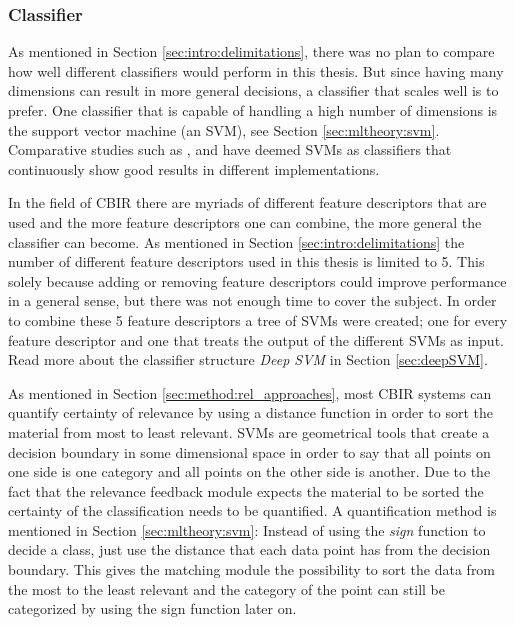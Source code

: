 \subsubsection{Classifier}
\label{sec:method:proposed:matching:classifier}
As mentioned in Section \ref{sec:intro:delimitations}, there was no plan to compare how well different classifiers would perform in this thesis. 
But since having many dimensions can result in more general decisions, a classifier that scales well is to prefer. One classifier that is capable of handling a high number of dimensions is the support vector machine (an SVM), see Section \ref{sec:mltheory:svm}. 
Comparative studies such as \cite{IRJET2017classificationMethods}, \cite{SMMR2016comparisionClassificationMethods} and \cite{Informatica2007revClassification} have deemed SVMs as classifiers that continuously show good results in different implementations. 

In the field of CBIR there are myriads of different feature descriptors that are used and the more feature descriptors one can combine, the more general the classifier can become. As mentioned in Section \ref{sec:intro:delimitations} the number of different feature descriptors used in this thesis is limited to 5. This solely because adding or removing feature descriptors could improve performance in a general sense, but there was not enough time to cover the subject. In order to combine these 5 feature descriptors a tree of SVMs were created; one for every feature descriptor and one that treats the output of the different SVMs as input. Read more about the classifier structure \emph{Deep SVM} in Section \ref{sec:deepSVM}. 

As mentioned in Section \ref{sec:method:rel_approaches}, most CBIR systems can quantify certainty of relevance by using a distance function in order to sort the material from most to least relevant. SVMs are geometrical tools that create a decision boundary in some dimensional space in order to say that all points on one side is one category and all points on the other side is another. Due to the fact that the relevance feedback module expects the material to be sorted the certainty of the classification needs to be quantified. A quantification method is mentioned in Section \ref{sec:mltheory:svm}: Instead of using the \emph{sign} function to decide a class, just use the distance that each data point has from the decision boundary. This gives the matching module the possibility to sort the data from the most to the least relevant and the category of the point can still be categorized by using the sign function later on. 


